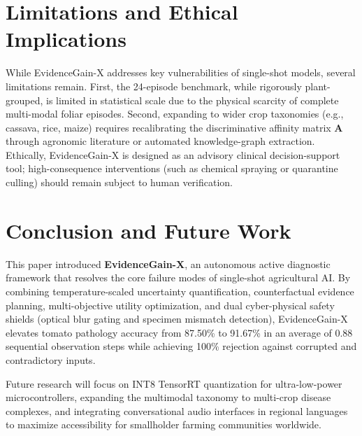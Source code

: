 \documentclass[conference]{IEEEtran}
\begin{document}
\section{Limitations and Ethical Implications}
While EvidenceGain-X addresses key vulnerabilities of single-shot models, several limitations remain. First, the 24-episode benchmark, while rigorously plant-grouped, is limited in statistical scale due to the physical scarcity of complete multi-modal foliar episodes. Second, expanding to wider crop taxonomies (e.g., cassava, rice, maize) requires recalibrating the discriminative affinity matrix $\mathbf{A}$ through agronomic literature or automated knowledge-graph extraction. Ethically, EvidenceGain-X is designed as an advisory clinical decision-support tool; high-consequence interventions (such as chemical spraying or quarantine culling) should remain subject to human verification.

\section{Conclusion and Future Work}
This paper introduced \textbf{EvidenceGain-X}, an autonomous active diagnostic framework that resolves the core failure modes of single-shot agricultural AI. By combining temperature-scaled uncertainty quantification, counterfactual evidence planning, multi-objective utility optimization, and dual cyber-physical safety shields (optical blur gating and specimen mismatch detection), EvidenceGain-X elevates tomato pathology accuracy from 87.50\% to 91.67\% in an average of 0.88 sequential observation steps while achieving 100\% rejection against corrupted and contradictory inputs.

Future research will focus on INT8 TensorRT quantization for ultra-low-power microcontrollers, expanding the multimodal taxonomy to multi-crop disease complexes, and integrating conversational audio interfaces in regional languages to maximize accessibility for smallholder farming communities worldwide.
\end{document}

